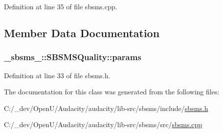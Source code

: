 Definition at line 35 of file sbsms.\+cpp.



\subsection{Member Data Documentation}
\subsubsection[{\texorpdfstring{params}{params}}]{ \+\_\+sbsms\+\_\+\+::\+S\+B\+S\+M\+S\+Quality\+::params}\hypertarget{class__sbsms___1_1_s_b_s_m_s_quality_aaffdf053cc2f970b928f9f39885d9c9e}{}\label{class__sbsms___1_1_s_b_s_m_s_quality_aaffdf053cc2f970b928f9f39885d9c9e}


Definition at line 33 of file sbsms.\+h.



The documentation for this class was generated from the following files\+:\begin{DoxyCompactItemize}
\item 
C\+:/\+\_\+dev/\+Open\+U/\+Audacity/audacity/lib-\/src/sbsms/include/\hyperlink{sbsms_8h}{sbsms.\+h}\item 
C\+:/\+\_\+dev/\+Open\+U/\+Audacity/audacity/lib-\/src/sbsms/src/\hyperlink{sbsms_8cpp}{sbsms.\+cpp}\end{DoxyCompactItemize}
